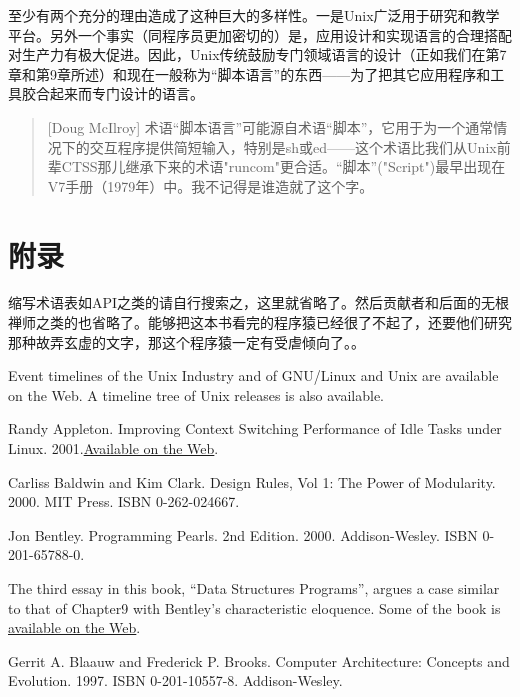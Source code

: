 \documentclass[12pt,oneside]{book}
\begin{document}
\begin{common-format}
至少有两个充分的理由造成了这种巨大的多样性。一是Unix广泛用于研究和教学平台。另外一个事实（同程序员更加密切的）是，应用设计和实现语言的合理搭配对生产力有极大促进。因此，Unix传统鼓励专门领域语言的设计（正如我们在第7章和第9章所述）和现在一般称为“脚本语言”的东西——为了把其它应用程序和工具胶合起来而专门设计的语言。

\begin{quote}[Doug McIlroy]
术语“脚本语言”可能源自术语“脚本”，它用于为一个通常情况下的交互程序提供简短输入，特别是sh或ed——这个术语比我们从Unix前辈CTSS那儿继承下来的术语"runcom"更合适。“脚本”("Script")最早出现在V7手册（1979年）中。我不记得是谁造就了这个字。
\end{quote}





\chapter{附录}
缩写术语表如API之类的请自行搜索之，这里就省略了。然后贡献者和后面的无根禅师之类的也省略了。能够把这本书看完的程序猿已经很了不起了，还要他们研究那种故弄玄虚的文字，那这个程序猿一定有受虐倾向了。。

\backmatter
{}

Event timelines of the Unix Industry and of GNU/Linux and Unix are available on the Web. A timeline tree of Unix releases is also available.

\begin{thebibliography}{9}
 Randy Appleton. Improving Context Switching Performance of Idle Tasks under Linux. 2001.\href{http://euclid.nmu.edu/~randy/Research/Papers/Scheduler/}{Available on the Web}.

 Carliss Baldwin and Kim Clark. Design Rules, Vol 1: The Power of Modularity. 2000. MIT Press. ISBN 0-262-024667.

 Jon Bentley. Programming Pearls. 2nd Edition. 2000. Addison-Wesley. ISBN 0-201-65788-0.

The third essay in this book, “Data Structures Programs”, argues a case similar to that of Chapter9 with Bentley's characteristic eloquence. Some of the book is \href{http://www.cs.bell-labs.com/cm/cs/pearls/}{available on the Web}.

 Gerrit A. Blaauw and Frederick P. Brooks. Computer Architecture: Concepts and Evolution. 1997. ISBN 0-201-10557-8. Addison-Wesley.


\end{thebibliography}
\end{common-format}
\end{document}
